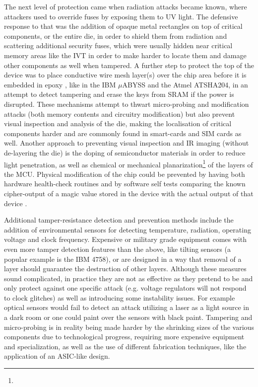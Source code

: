 The next level of protection came when radiation attacks became known\citep{sergei:thesis}, where attackers used to override fuses by exposing them to UV light. The defensive response to that was the addition of opaque metal rectangles on top of critical components, or the entire die, in order to shield them from radiation and scattering additional security fuses, which were usually hidden near critical memory areas like the IVT in order to make harder to locate them and damage other components as well when tampered\citep{sergei:thesis}\citep{hwre}. A further step to protect the top of the device was to place conductive wire mesh layer(s) over the chip area before it is embedded in epoxy , like in the IBM $\mu$ABYSS \citep{website:ibm_secure} and the Atmel ATSHA204\citep{hwre}, in an attempt to detect tampering and erase the keys from SRAM if the power is disrupted. These mechanisms attempt to thwart micro-probing and modification attacks (both memory contents and circuitry modification)  but also prevent visual inspection and analysis of the die\citep{hwre}, making the localisation of critical components harder and are commonly found in smart-cards\citep{sergei:thesis} and SIM cards as well\citep{hwre}. Another approach to preventing visual inspection and IR imaging (without de-layering the die) is the doping of semiconductor materials in order to reduce light penetration\citep{sergei:thesis}, as well as chemical or mechanical planarization\footnote{} of the layers of the MCU\citep{sergei:thesis}. Physical modification of the chip could be prevented by having both hardware health-check routines and by software self tests comparing the known cipher-output of a magic value stored in the device with the actual output of that device \citep{anderson:tamper_resistance}.

Additional tamper-resistance detection and prevention methods include the addition of environmental sensors for detecting temperature, radiation, operating voltage and clock frequency\citep{sergei:thesis}. Expensive or military grade equipment comes with even more tamper detection features than the above, like tilting sensors (a popular example is the IBM 4758)\citep{website:ibm_secure}, or are designed in a way that removal of a layer should guarantee the destruction of other layers\citep{anderson:cautionary_note}. Although these measures sound complicated, in practice they are not as effective as they pretend to be and only protect against one specific attack (e.g. voltage regulators will not respond to clock glitches) as well as introducing some instability issues\citep{anderson:cautionary_note}. For example optical sensors would fail to detect an attack utilizing a laser as a light source in a dark room\citep{hwre} or one could paint over the sensors with black paint\citep{sergei:thesis}. Tampering and micro-probing is in reality being made harder by the shrinking sizes of the various components due to technological progress, requiring more expensive equipment and specialization, as well as the use of different fabrication techniques, like the application of an ASIC-like design\citep{sergei:thesis}\citep{hwre}.